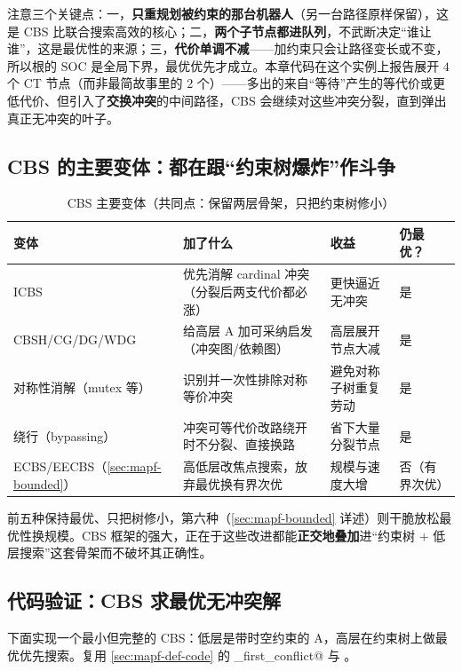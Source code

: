 注意三个关键点：一，\textbf{只重规划被约束的那台机器人}（另一台路径原样保留），这是 CBS 比联合搜索高效的核心；二，\textbf{两个子节点都进队列}，不武断决定“谁让谁”，这是最优性的来源；三，\textbf{代价单调不减}——加约束只会让路径变长或不变，所以根的 $\mathrm{SOC}$ 是全局下界，最优优先才成立。本章代码在这个实例上报告展开 $4$ 个 CT 节点（而非最简故事里的 $2$ 个）——多出的来自“等待”产生的等代价或更低代价、但引入了\textbf{交换冲突}的中间路径，CBS 会继续对这些冲突分裂，直到弹出真正无冲突的叶子。

\subsection{CBS 的主要变体：都在跟“约束树爆炸”作斗争}
\label{sec:mapf-cbs-variants}

\begin{table}[H]\centering\small
\caption{CBS 主要变体（共同点：保留两层骨架，只把约束树修小）}
\label{tab:mapf-cbs-variants}
\begin{tabularx}{\linewidth}{lLLl}
\toprule
变体 & 加了什么 & 收益 & 仍最优？ \\
\midrule
ICBS\cite{boyarski2015icbs} & 优先消解 cardinal 冲突（分裂后两支代价都必涨） & 更快逼近无冲突 & 是 \\
CBSH/CG/DG/WDG\cite{felner2018adding,li2019cbsh} & 给高层 A\* 加可采纳启发（冲突图/依赖图） & 高层展开节点大减 & 是 \\
对称性消解（mutex 等） & 识别并一次性排除对称等价冲突 & 避免对称子树重复劳动 & 是 \\
绕行（bypassing） & 冲突可等代价改路绕开时不分裂、直接换路 & 省下大量分裂节点 & 是 \\
ECBS/EECBS（\cref{sec:mapf-bounded}） & 高低层改焦点搜索，放弃最优换有界次优 & 规模与速度大增 & 否（有界次优） \\
\bottomrule
\end{tabularx}
\end{table}

前五种保持最优、只把树修小，第六种（\cref{sec:mapf-bounded} 详述）则干脆放松最优性换规模。CBS 框架的强大，正在于这些改进都能\textbf{正交地叠加}进“约束树 $+$ 低层搜索”这套骨架而不破坏其正确性。

\subsection{代码验证：CBS 求最优无冲突解}
\label{sec:mapf-cbs-code}

下面实现一个最小但完整的 CBS：低层是带时空约束的 A\*，高层在约束树上做最优优先搜索。复用 \cref{sec:mapf-def-code} 的 \verb@find_first_conflict@ 与 \verb@neighbors@。

